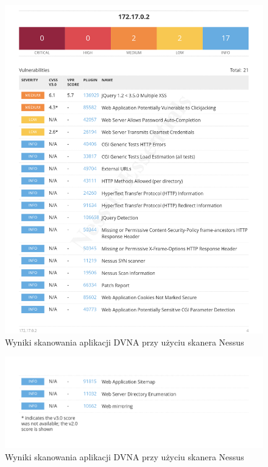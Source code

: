 \begin{figure}[H]
  \centering
  \includegraphics[width=\linewidth]{img/nessus-dvna-before.png}
  \caption{Wyniki skanowania aplikacji DVNA przy użyciu skanera Nessus}
  \label{fig:nessus-dvna-before}
\end{figure}
\begin{figure}[H]
  \centering
  \includegraphics[width=\linewidth]{img/nessus-dvna-before2.png}
  \caption{Wyniki skanowania aplikacji DVNA przy użyciu skanera Nessus}
  \label{fig:nessus-dvna-before2}
\end{figure}

